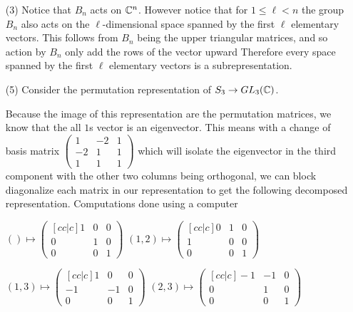 \documentclass[12pt]{amsart}
\begin{document}
\begin{itemize}
\item[(3)] %
           Notice that $B_n$ acts on $\mathbb{C}^n$. However notice that for $1\leq \ell < n$ the group
           $B_n$ also acts on the $\ell$-dimensional space spanned by the first $\ell$ elementary vectors.
           This follows from $B_n$ being the upper triangular matrices, and so action by 
           $B_n$ only add the rows of the vector upward
           Therefore every space spanned by the first $\ell$ elementary vectors is a subrepresentation.

\item[(5)] %
            Consider the permutation representation of $S_3\rightarrow GL_3(\mathbb{C})$.

            Because the image of this representation are the permutation matrices, we know that the all $1$s vector
            is an eigenvector.
            This means with a change of basis matrix $\begin{pmatrix}
                1 & -2 & 1 \\
                -2 & 1 & 1 \\
                1 & 1 & 1
            \end{pmatrix}$ which will isolate the eigenvector in the third component with  
            the other two columns being orthogonal, we can block diagonalize each matrix 
            in our representation to get the following decomposed representation.
            Computations done using a computer

            $()\mapsto\begin{pmatrix}[cc|c]
                1 & 0 & 0 \\
                0 & 1 & 0 \\
                \hline
                0 & 0 & 1
            \end{pmatrix}$ $(1,2)\mapsto\begin{pmatrix}[cc|c]
                0 & 1 & 0 \\
                1 & 0 & 0 \\
                \hline
                0 & 0 & 1
            \end{pmatrix}$

            $(1,3)\mapsto\begin{pmatrix}[cc|c]
                1 & 0 & 0 \\
                -1 & -1 & 0 \\
                \hline
                0 & 0 & 1
            \end{pmatrix}$ $(2,3)\mapsto\begin{pmatrix}[cc|c]
                -1 & -1 & 0 \\
                0 & 1 & 0 \\
                \hline
                0 & 0 & 1
            \end{pmatrix}$


\end{itemize}
\end{document}
